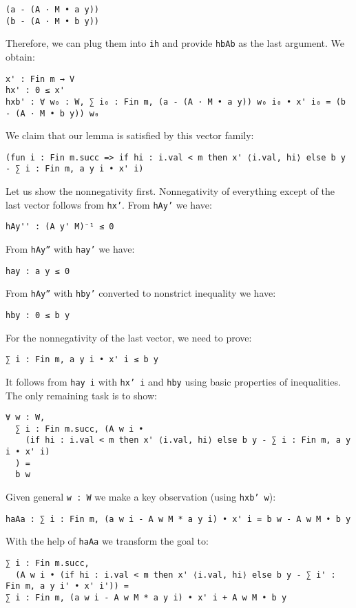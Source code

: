 \documentclass[]{article}
\renewcommand{\.}{\hskip .75pt}
\begin{document}
\begin{lstlisting}
(a - (A · M • a y))
(b - (A · M • b y))
\end{lstlisting}
Therefore, we can plug them into \texttt{ih} and provide \texttt{hbAb} as the last argument.
We obtain:
\begin{lstlisting}
x' : Fin m → V
hx' : 0 ≤ x'
hxb' : ∀ w₀ : W, ∑ i₀ : Fin m, (a - (A · M • a y)) w₀ i₀ • x' i₀ = (b - (A · M • b y)) w₀
\end{lstlisting}
We claim that our lemma is satisfied by this vector family:
\begin{lstlisting}
(fun i : Fin m.succ => if hi : i.val < m then x' ⟨i.val, hi⟩ else b y - ∑ i : Fin m, a y i • x' i)
\end{lstlisting}
Let us show the nonnegativity first.
Nonnegativity of everything except of the last vector follows from \texttt{hx'}.
From \texttt{hAy'} we have:
\begin{lstlisting}
hAy'' : (A y' M)⁻¹ ≤ 0
\end{lstlisting}
From \texttt{hAy''} with \texttt{hay'} we have:
\begin{lstlisting}
hay : a y ≤ 0
\end{lstlisting}
From \texttt{hAy''} with \texttt{hby'} converted to nonstrict inequality we have:
\begin{lstlisting}
hby : 0 ≤ b y
\end{lstlisting}
For the nonnegativity of the last vector, we need to prove:
\begin{lstlisting}
∑ i : Fin m, a y i • x' i ≤ b y
\end{lstlisting}
It follows from \texttt{hay i} with \texttt{hx' i} and \texttt{hby} using basic properties of inequalities.
The only remaining task is to show:
\begin{lstlisting}
∀ w : W, 
  ∑ i : Fin m.succ, (A w i •
    (if hi : i.val < m then x' ⟨i.val, hi⟩ else b y - ∑ i : Fin m, a y i • x' i)
  ) =
  b w
\end{lstlisting}
Given general \texttt{w :~W} we make a key observation (using \texttt{hxb' w}):
\begin{lstlisting}
haAa : ∑ i : Fin m, (a w i - A w M * a y i) • x' i = b w - A w M • b y
\end{lstlisting}
With the help of \texttt{haAa} we transform the goal to:
\begin{lstlisting}
∑ i : Fin m.succ,
  (A w i • (if hi : i.val < m then x' ⟨i.val, hi⟩ else b y - ∑ i' : Fin m, a y i' • x' i')) =
∑ i : Fin m, (a w i - A w M * a y i) • x' i + A w M • b y
\end{lstlisting}
\end{document}
